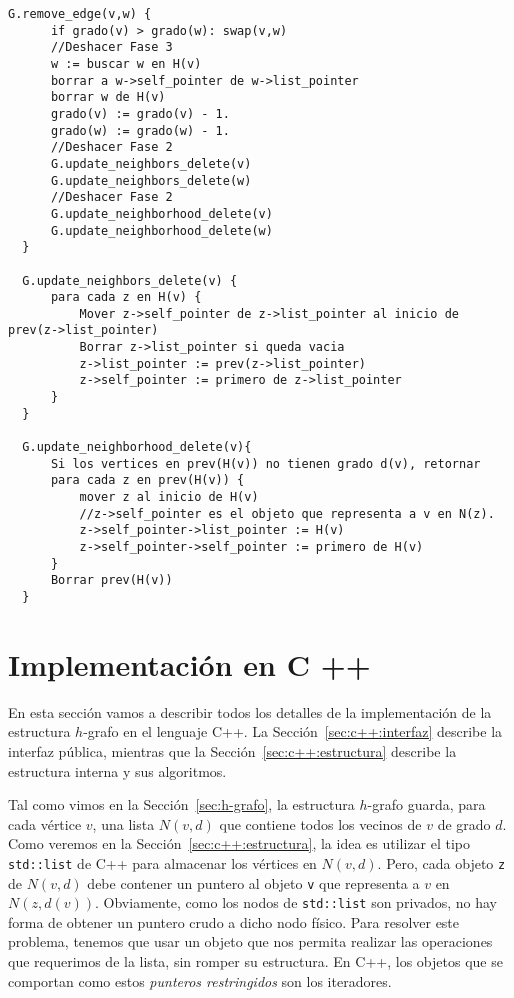 \documentclass[%
    a4paper,%
    12pt,%
    twoside,%
    openright,%
    halfparskip,%
    cleardoubleempty,%
    bigheadings,%
    titlepage,%
    headsepline%
]{scrbook}
\makeatletter
\newcommand{\Code}[1]{\lstinline[basicstyle={\tt}]@#1@}
\makeatother
\begin{document}
\begin{lstlisting}[caption={Implementación de \Code{remove_edge}, deshaciendo las tres fases de la \Code{insert_edge}.},name=remove_edge,gobble=2,float=ht,label={lst:hgraph:remove_edge},commentstyle={\color{red}},morecomment={[l]{//}}]
  G.remove_edge(v,w) {
      if grado(v) > grado(w): swap(v,w)
      //Deshacer Fase 3
      w := buscar w en H(v)
      borrar a w->self_pointer de w->list_pointer
      borrar w de H(v)
      grado(v) := grado(v) - 1.
      grado(w) := grado(w) - 1.
      //Deshacer Fase 2
      G.update_neighbors_delete(v)
      G.update_neighbors_delete(w)
      //Deshacer Fase 2
      G.update_neighborhood_delete(v)
      G.update_neighborhood_delete(w)
  }
  
  G.update_neighbors_delete(v) {
      para cada z en H(v) {
          Mover z->self_pointer de z->list_pointer al inicio de prev(z->list_pointer)
          Borrar z->list_pointer si queda vacia
          z->list_pointer := prev(z->list_pointer)
          z->self_pointer := primero de z->list_pointer
      }
  }
  
  G.update_neighborhood_delete(v){
      Si los vertices en prev(H(v)) no tienen grado d(v), retornar
      para cada z en prev(H(v)) {
          mover z al inicio de H(v)
          //z->self_pointer es el objeto que representa a v en N(z).
          z->self_pointer->list_pointer := H(v)
          z->self_pointer->self_pointer := primero de H(v)
      }
      Borrar prev(H(v))
  }
\end{lstlisting}


\chapter{Implementación en C ++}
\label{sec:c++}

En esta sección vamos a describir todos los detalles de la implementación de la estructura $h$-grafo en el lenguaje C++.  La Sección~\ref{sec:c++:interfaz} describe la interfaz pública, mientras que la Sección~\ref{sec:c++:estructura} describe la estructura interna y sus algoritmos.  

Tal como vimos en la Sección~\ref{sec:h-grafo}, la estructura $h$-grafo guarda, para cada  vértice $v$, una lista $N(v, d)$ que contiene todos los vecinos de $v$ de grado $d$.  Como veremos en la Sección~\ref{sec:c++:estructura}, la idea es utilizar el tipo \texttt{std::list} de C++ para almacenar los vértices en $N(v, d)$.  Pero, cada objeto \texttt{z} de $N(v, d)$ debe contener un puntero al objeto \texttt{v} que representa a $v$ en $N(z, d(v))$.  Obviamente, como los nodos de \texttt{std::list} son privados, no hay forma de obtener un puntero crudo a dicho nodo físico.  Para resolver este problema, tenemos que usar un objeto que nos permita realizar las operaciones que requerimos de la lista, sin romper su estructura.  En C++, los objetos que se comportan como estos \emph{punteros restringidos} son los iteradores.  
\end{document}

